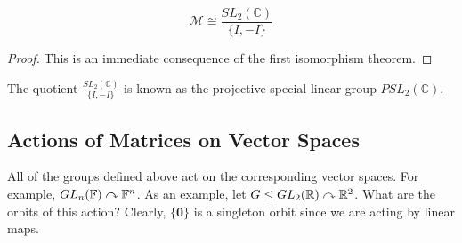 \documentclass{article}
\begin{document}
\begin{corollary}
	\[ \mathcal M \cong \frac{SL_2(\mathbb C)}{\{ I, -I \}} \]
\end{corollary}
\begin{proof}
	This is an immediate consequence of the first isomorphism theorem.
\end{proof}
The quotient $\frac{SL_2(\mathbb C)}{\{ I, -I \}}$ is known as the projective special linear group $PSL_2(\mathbb C)$.

\subsection{Actions of Matrices on Vector Spaces}
All of the groups defined above act on the corresponding vector spaces. For example, $GL_n(\mathbb F) \curvearrowright \mathbb F^n$. As an example, let $G \leq GL_2(\mathbb R) \curvearrowright \mathbb R^2$. What are the orbits of this action? Clearly, $\{ \bm 0 \}$ is a singleton orbit since we are acting by linear maps.
\end{document}
